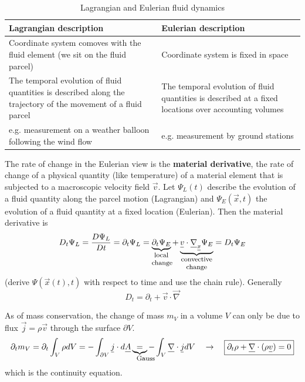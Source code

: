 \begin{table}[!htb]
    \centering
    \begin{tabular}{|p{}|p{}|}
        \hline
        \textcolor{blue1}{Lagrangian description} & \textcolor{blue1}{Eulerian description} \\
        \hline
        Coordinate system comoves with the fluid element (we sit on the fluid parcel) & Coordinate system is fixed in space \\
        \hline
        The temporal evolution of fluid quantities is described along the trajectory of the movement of a fluid parcel & The temporal evolution of fluid quantities is described at a fixed locations over accounting volumes \\
        \hline
        e.g. measurement on a weather balloon following the wind flow & e.g. measurement by ground stations \\
        \hline
    \end{tabular}
    \caption{Lagrangian and Eulerian fluid dynamics}
    \label{tab:lagrangian_eulerian}
\end{table}

The rate of change in the Eulerian view is the \textbf{material derivative}, the rate of change of a physical quantity 
(like temperature) of a material element that is subjected to a macroscopic velocity field $\vec{v}$. Let $\Psi_L(t)$ describe
the evolution of a fluid quantity along the parcel motion (Lagrangian) and $\Psi_E(\vec{x},t)$ the evolution of a fluid
quantity at a fixed location (Eulerian). Then the material derivative is
\begin{equation}
    D_t \Psi_L = \frac{D\Psi_L}{Dt} = \partial_t \Psi_L =  \explain{\partial_t \Psi_E}{local change} + \explain{\vec{v} \cdot \vec{\nabla}_\vec{x} \Psi_E}{convective change} = D_t \Psi_E
\end{equation}
(derive $\Psi(\vec{x}(t),t)$ with respect to time and use the chain rule). Generally
\begin{equation}
    D_t = \partial_t + \vec{v} \cdot \vec{\nabla}
\end{equation}

As of mass conservation, the change of mass $m_V$ in a volume $V$ can only be due to flux $\vec{j} = \rho \vec{v}$ through the surface $\partial V$.
\begin{equation}
    \partial_t m_V = \partial_t \int_V \rho dV = - \int_{\partial V} \vec{j} \cdot d\vec{A} \explain{=}{Gauss} - \int_V \vec{\nabla} \cdot \vec{j} dV \quad \rightarrow \quad \boxed{\partial_t \rho + \vec{\nabla} \cdot (\rho \vec{v}) = 0}
\end{equation}
which is the continuity equation.

